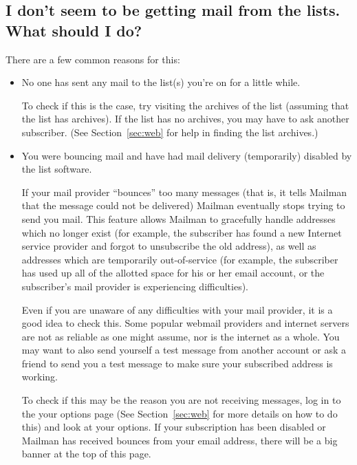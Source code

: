 \documentclass{howto}
\begin{document}
\subsection{I don't seem to be getting mail from the lists.  What should
	I do?}
There are a few common reasons for this:
\begin{itemize}
	\item No one has sent any mail to the list(s) you're on for a little while.

	To check if this is the case, try visiting the archives of the list 
	(assuming that the list has archives).  If the list has no archives, you
	may have to ask another subscriber.  (See Section~\ref{sec:web} for help
	in finding the list archives.)


	\item You were bouncing mail and have had mail delivery (temporarily) 
	disabled by the list software.

	If your mail provider ``bounces'' too many messages (that is, it tells
	Mailman that the message could not be delivered)
	Mailman eventually stops trying to send you mail.  This feature allows
	Mailman to gracefully handle addresses which no longer exist (for example,
	the subscriber has found a new Internet service provider and forgot to 
	unsubscribe the old address), as well
	as addresses which are temporarily out-of-service (for example, the 
	subscriber has used up all of the allotted space for his or her email
	account, or the subscriber's mail provider is experiencing difficulties).

	Even if you are unaware of any difficulties with your mail provider, it 
	is a good idea to check this.  Some popular webmail providers and 
	internet servers are not as reliable as one might assume, nor is the
	internet as a whole.  You may want to also send yourself a test message
	from another account or ask a friend to send you a test message to make
	sure your subscribed address is working.

	To check if this may be the reason you are not receiving messages, log in 
	to the your options page (See
	Section~\ref{sec:web} for more details on how to do this) and 
	look at your options.  
	If your subscription has been disabled or Mailman has received bounces from
	your email address, there will be a big banner at the top of this page.


\end{itemize}
\end{document}
